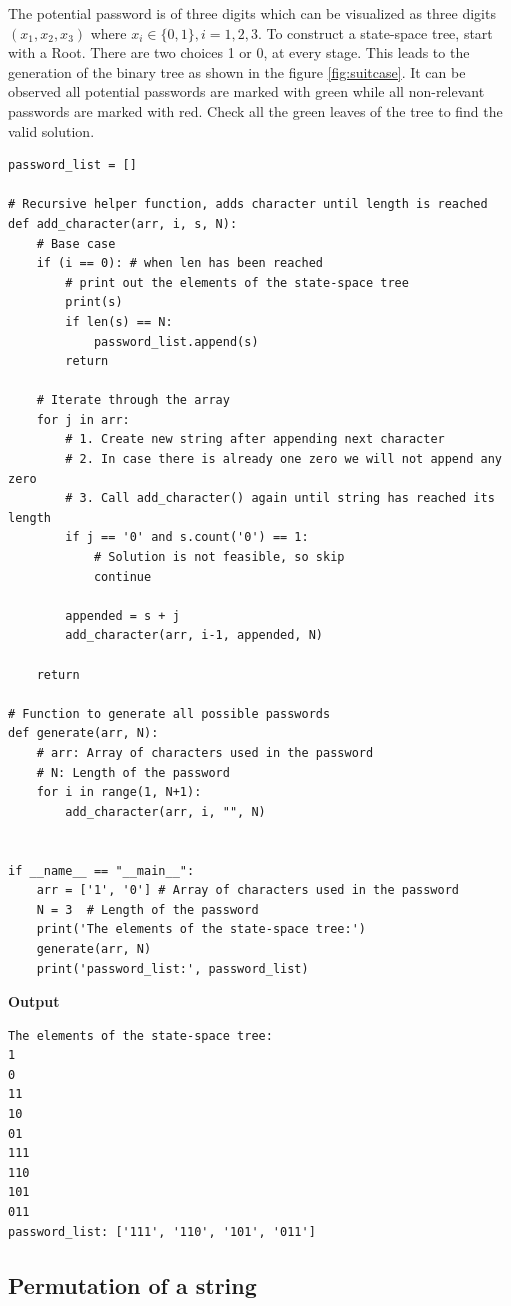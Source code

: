 \documentclass[a4paper,11pt]{book}
\begin{document}
\noindent The potential password is of three digits which can be visualized as three digits $(x_1, x_2, x_3)$ where $x_i \in \{0,1\}, i = 1,2,3$. To construct a state-space tree, start with a Root. There are two choices 1 or 0, at every stage. This leads to the generation of the binary tree as shown in the figure \ref{fig:suitcase}. It can be observed all potential passwords are marked with green while all non-relevant passwords are marked with red. Check all the green leaves of the tree to find the valid solution.

\begin{lstlisting}
password_list = []

# Recursive helper function, adds character until length is reached
def add_character(arr, i, s, N):
    # Base case
    if (i == 0): # when len has been reached
        # print out the elements of the state-space tree
        print(s)
        if len(s) == N:
            password_list.append(s)
        return
     
    # Iterate through the array
    for j in arr:
        # 1. Create new string after appending next character 
        # 2. In case there is already one zero we will not append any zero
        # 3. Call add_character() again until string has reached its length
        if j == '0' and s.count('0') == 1:
            # Solution is not feasible, so skip
            continue
        
        appended = s + j
        add_character(arr, i-1, appended, N)
 
    return
 
# Function to generate all possible passwords
def generate(arr, N):
    # arr: Array of characters used in the password
    # N: Length of the password
    for i in range(1, N+1):
        add_character(arr, i, "", N)

     
if __name__ == "__main__":
    arr = ['1', '0'] # Array of characters used in the password
    N = 3  # Length of the password
    print('The elements of the state-space tree:')
    generate(arr, N)
    print('password_list:', password_list)
\end{lstlisting}
\textbf{Output}
\begin{lstlisting}
The elements of the state-space tree:
1
0
11
10
01
111
110
101
011
password_list: ['111', '110', '101', '011']
\end{lstlisting}

\subsection{Permutation of a string}
\end{document}

